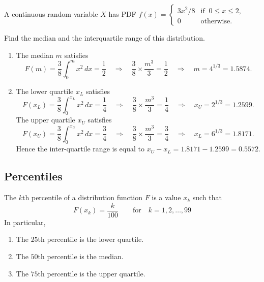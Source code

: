 \documentclass[lecture]{csm}
\newcommand{\R}{\mathbb{R}}
\def\it{\item}
\def\ben{\begin{enumerate}}
\def\een{\end{enumerate}}
\begin{document}
\begin{example}
A continuous random variable $X$ has PDF 
$
f(x) = \begin{cases}
	3x^2/8		& \text{if }\ 0\leq x\leq 2, \\
	0		& \text{otherwise}.	
\end{cases}
$
\par
Find the median and the interquartile range of this distribution.
\end{example}

\begin{solution}
\ben
\it %
The median $m$ satisfies
\[
F(m) = \frac{3}{8}\int_0^{m} x^2\,dx = \frac{1}{2}
\quad\Rightarrow\quad
\frac{3}{8}\times\frac{m^3}{3} = \frac{1}{2}
\quad\Rightarrow\quad
m = 4^{1/3} = 1.5874.
\]
\it %
The lower quartile $x_L$ satisfies
\[
F(x_L) = \frac{3}{8}\int_0^{x_L} x^2\,dx = \frac{1}{4}
\quad\Rightarrow\quad
\frac{3}{8}\times\frac{m^3}{3} = \frac{1}{4}
\quad\Rightarrow\quad
x_U = 2^{1/3} = 1.2599.
\]
The upper quartile $x_U$ satisfies
\[
F(x_U) = \frac{3}{8}\int_0^{x_U} x^2\,dx = \frac{3}{4}
\quad\Rightarrow\quad
\frac{3}{8}\times\frac{m^3}{3} = \frac{3}{4}
\quad\Rightarrow\quad
x_L = 6^{1/3} = 1.8171.
\]
Hence the inter-quartile range is equal to $x_U-x_L = 1.8171 - 1.2599 = 0.5572$.
\een
\end{solution}

\newpage
\subsection{Percentiles}
\begin{definition}
The $k$th percentile of a distribution function $F$ is a value $x_k$ such that
\[
F(x_k) = \frac{k}{100} \qquad\text{for}\quad k=1,2,\ldots,99
\]
In particular, 
\ben
\it The $25$th percentile is the lower quartile.
\it The $50$th percentile is the median.
\it The $75$th percentile is the upper quartile.
\een
\end{definition}
\end{document}
